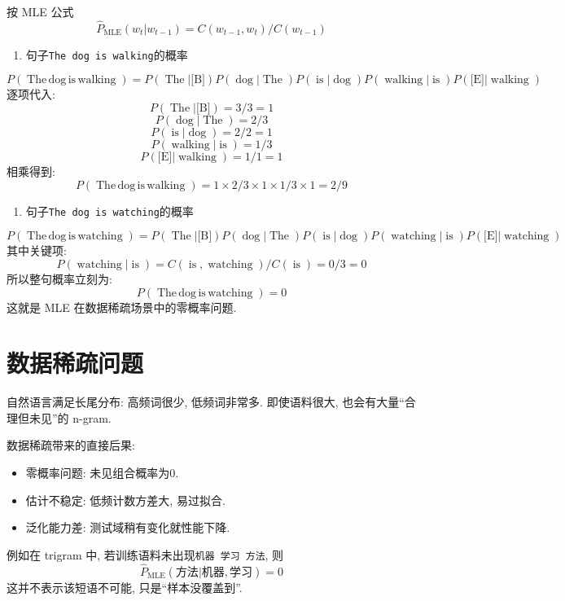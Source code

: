 按 MLE 公式
\[
\hat{P}_{\operatorname{MLE}}(w_t | w_{t-1}) = C(w_{t-1}, w_t) / C(w_{t-1})
\]

\begin{enumerate}
\item[1.] 句子\texttt{The dog is walking}的概率
\end{enumerate}
\[
P(\operatorname{The\,dog\,is\,walking})
  = P(\operatorname{The}|\text{[B]}) P(\operatorname{dog}|\operatorname{The}) P(\operatorname{is}|\operatorname{dog}) P(\operatorname{walking}|\operatorname{is}) P(\text{[E]}|\operatorname{walking})
\]
逐项代入:
\[
P(\operatorname{The}|\text{[B]}) = 3/3 = 1
\]
\[
P(\operatorname{dog}|\operatorname{The}) = 2/3
\]
\[
P(\operatorname{is}|\operatorname{dog}) = 2/2 = 1
\]
\[
P(\operatorname{walking}|\operatorname{is}) = 1/3
\]
\[
P(\text{[E]}|\operatorname{walking}) = 1/1 = 1
\]
相乘得到:
\[
P(\operatorname{The\,dog\,is\,walking}) = 1 \times 2/3 \times 1 \times 1/3 \times 1 = 2/9
\]

\begin{enumerate}
\item[2.] 句子\texttt{The dog is watching}的概率
\end{enumerate}
\[
P(\operatorname{The\,dog\,is\,watching})
  = P(\operatorname{The}|\text{[B]}) P(\operatorname{dog}|\operatorname{The}) P(\operatorname{is}|\operatorname{dog}) P(\operatorname{watching}|\operatorname{is}) P(\text{[E]}|\operatorname{watching})
\]
其中关键项:
\[
P(\operatorname{watching}|\operatorname{is}) = C(\operatorname{is},\operatorname{watching}) / C(\operatorname{is}) = 0/3 = 0
\]
所以整句概率立刻为:
\[
P(\operatorname{The\,dog\,is\,watching}) = 0
\]
这就是 MLE 在数据稀疏场景中的零概率问题.


\section{数据稀疏问题}


自然语言满足长尾分布: 高频词很少, 低频词非常多.
即使语料很大, 也会有大量“合理但未见”的 n-gram.

数据稀疏带来的直接后果:

\begin{itemize}
\item 零概率问题: 未见组合概率为$0$.
\item 估计不稳定: 低频计数方差大, 易过拟合.
\item 泛化能力差: 测试域稍有变化就性能下降.
\end{itemize}

例如在 trigram 中, 若训练语料未出现\texttt{机器 学习 方法}, 则
\[
\hat{P}_{\operatorname{MLE}}(\text{方法} | \text{机器}, \text{学习}) = 0
\]
这并不表示该短语不可能, 只是“样本没覆盖到”.

